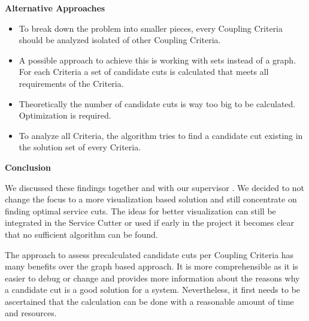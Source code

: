 \textbf{Alternative Approaches}

\begin{itemize}
	\item To break down the problem into smaller pieces, every Coupling Criteria should be analyzed isolated of other Coupling Criteria. 
	\item A possible approach to achieve this is working with sets instead of a graph. For each Criteria a set of candidate cuts is calculated that meets all requirements of the Criteria. 
	\item Theoretically the number of candidate cuts is way too big to be calculated. Optimization is required.
	\item To analyze all Criteria, the algorithm tries to find a candidate cut existing in the solution set of every Criteria. 
\end{itemize}

\textbf{Conclusion}

We discussed these findings together and with our supervisor	. We decided to not change the focus to a more visualization based solution and still concentrate on finding optimal service cuts. The ideas for better visualization can still be integrated in the Service Cutter or used if early in the project it becomes clear that no sufficient algorithm can be found. 

The approach to assess precalculated candidate cuts per Coupling Criteria has many benefits over the graph based approach. It is more comprehensible as it is easier to debug or change and provides more information about the reasons why a candidate cut is a good solution for a system. Nevertheless, it first needs to be ascertained that the calculation can be done with a reasonable amount of time and resources. 